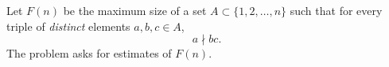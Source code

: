 Let $F(n)$ be the maximum size of a set $A\subset\{1,2,\dots,n\}$ such that
for every triple of \emph{distinct} elements $a,b,c\in A$,
\[
 a \nmid bc.
\]
The problem asks for estimates of $F(n)$.
